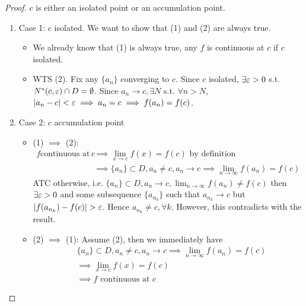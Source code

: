 \begin{proof}
    \medskip

    $c$ is either an isolated point or an accumulation point. 
    \begin{enumerate}
        \item Case 1: $c$ isolated.
        We want to show that (1) and (2) are always true. 
        \begin{itemize}
            \item We already know that (1) is always true, 
            any $f$ is continuous at $c$ if $c$ isolated.
            \item WTS (2). Fix any $\{ a_n \}$ converging to $c$. 
            Since $c$ isolated, $\exists \varepsilon > 0$ s.t. 
            $N^*(c, \varepsilon) \cap D = \emptyset$. 
            Since $a_n \to c, \exists N$ s.t. $\forall n > N$,
            $|a_n - c | < \varepsilon \implies a_n = c \implies f(a_n) = f(c)$.
        \end{itemize} 
        \item Case 2: $c$ accumulation point
            \begin{itemize}
                \item (1) $\implies$ (2): 
                \begin{align*}
                    f \text{continuous at } c 
                    & \implies \lim_{x \to c}f(x) = f(c) \text{ by definition} \\
                    & \implies \{ a_n \} \subset D, a_n \neq c, a_n \to c \implies 
                    \lim_{n \to \infty} f(a_n) = f(c)
                \end{align*}
                ATC otherwise, i.e. $\{ a_n \} \subset D, a_n \to c, \lim_{n \to \infty}f(a_n) \neq f(c)$
                then $\exists \varepsilon > 0$ and some subsequence $\{ a_{n_k} \} $
                such that $a_{n_k} \to c$ but $ \left| f(a_{n_k}) - f(c)\right|  > \varepsilon$.
                Hence $a_{n_k} \neq c, \forall k$. However, this contradicts with
                the result.
                \item (2) $\implies$ (1): 
                Assume (2), then we immediately have 
                \begin{align*}
                    &\{ a_n \} \subset D, a_n \neq c, a_n \to c \implies 
                    \lim_{n \to \infty} f(a_n) = f(c) \\
                    & \implies \lim_{x \to c}f(x) = f(c) \\
                    & \implies f \text{ continuous at } c
                \end{align*}
            \end{itemize} 
    \end{enumerate} 
\end{proof}

